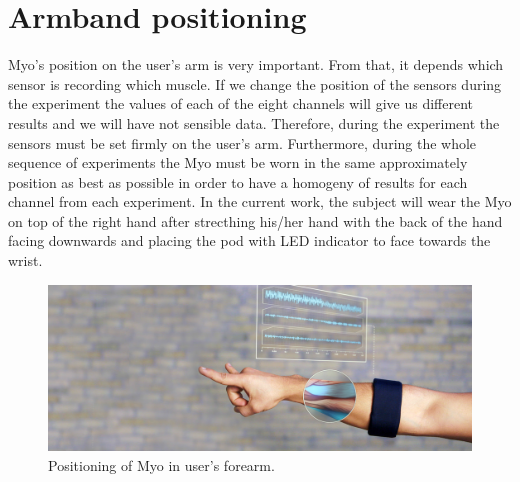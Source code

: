 \section{Armband positioning}
Myo's position on the user's arm is very important. From that, it depends which sensor is recording which muscle. If we change the position of the sensors during the experiment the values of each of the eight channels will give us different results and we will have not sensible data. Therefore, during the experiment the sensors must be set firmly on the user's arm. Furthermore, during the whole sequence of experiments the Myo must be worn in the same approximately position as best as possible in order to have a homogeny of results for each channel from each experiment. In the current work, the subject will wear the Myo on top of the right hand after strecthing his/her hand with the back of the hand facing downwards and placing the pod with LED indicator to face towards the wrist. 
\begin{figure}[H]
\includegraphics[width=15cm,left,keepaspectratio]{figures/myo}
\caption{Positioning of Myo in user's forearm. \cite{fig:myo_on_armband} }
\label{fig:myo_on_armband}
\end{figure}